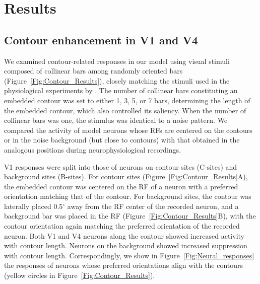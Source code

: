 \section{Results}
\label{sec:results}
\subsection{Contour enhancement in V1 and V4}
\label{sec:contour}
We examined contour-related responses in our model using visual
stimuli composed of collinear bars among randomly oriented bars
(Figure~\ref{Fig:Contour_Results}), closely matching the stimuli used
in the physiological experiments by \cite{Chen_etal14}. The number of
collinear bars constituting an embedded contour was set to either 1,
3, 5, or 7 bars, determining the length of the embedded contour, which
also controlled its saliency.  When the number of collinear bars was
one, the stimulus was identical to a noise pattern. We compared the
activity of model neurons whose RFs are centered on the contours or in
the noise background (but close to contours) with that obtained in the
analogous positions during neurophysiological recordings.

V1 responses were split into those of neurons on contour sites
(C-sites) and background sites (B-sites). For contour sites
(Figure~\ref{Fig:Contour_Results}A), the embedded contour was centered
on the RF of a neuron with a preferred orientation matching that of
the contour. For background sites, the contour was laterally placed
0.5$^{\circ}$ away from the RF center of the recorded neuron, and a
background bar was placed in the RF
(Figure~\ref{Fig:Contour_Results}B), with the contour orientation
again matching the preferred orientation of the recorded neuron.
Both V1 and V4 neurons along the contour showed increased activity with contour length. Neurons on the background showed increased suppression with contour length.
Correspondingly, we show in Figure~\ref{Fig:Neural_responses} the
responses of neurons whose preferred orientations align with the
contours (yellow circles in Figure~\ref{Fig:Contour_Results}).

